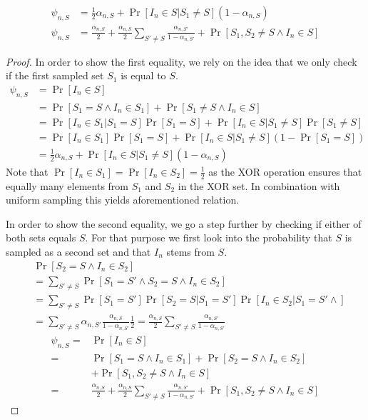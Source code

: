 \textbf{}
\begin{align}
  \psi_{n, S} &= \frac{1}{2} \alpha_{n, S} +  \Pr[I_n \in S | S_1 \neq S] (1 - \alpha_{n, S}) \\
  \psi_{n, S} &= \frac{\alpha_{n, S}}{2} +  \frac{\alpha_{n, S}}{2} \sum_{S'\neq S} \frac{\alpha_{n, S'}}{1 - \alpha_{n, S'}} + \Pr[S_1, S_2 \neq S \wedge I_n \in S]
\end{align}
\begin{proof}
  In order to show the first equality, we rely on the idea that we only check
  if the first sampled set $S_1$ is equal to $S$.
  \begin{align}
    \psi_{n, S} &= \Pr[I_n \in S] \\
      &= \Pr[S_1 = S \wedge I_n \in S_1] + \Pr[S_1 \neq S \wedge I_n \in S] \\
      &= \Pr[I_n \in S_1 | S_1 = S] \Pr[S_1 = S] + \Pr[I_n \in S| S_1 \neq
          S]\Pr[S_1 \neq S] \\
      &= \Pr[I_n \in S_1] \Pr[S_1 = S] + \Pr[I_n \in S| S_1 \neq S](1 - \Pr[S_1
          = S]) \\
      &= \frac{1}{2} \alpha_{n, S} +  \Pr[I_n \in S | S_1 \neq S] (1 -
          \alpha_{n, S})
  \end{align}
  Note that $\Pr[I_n \in S_1] = \Pr[I_n \in S_2] = \frac{1}{2}$ as the XOR
  operation ensures that equally many elements from $S_1$ and $S_2$ in the XOR
  set. In combination with uniform sampling this yields aforementioned relation.

  In order to show the second equality, we go a step further by checking if
  either of both sets equals $S$. For that purpose we first look into the
  probability that $S$ is sampled as a second set and that $I_n$ stems from $S$.
  \begin{align}
    & \Pr[S_2 = S \wedge I_n \in S_2] \\
    &= \sum_{S'\neq S}\Pr[S_1 = S' \wedge S_2 = S \wedge I_n \in S_2] \\
    &= \sum_{S'\neq S} \Pr[S_1 = S'] \Pr[S_2 = S | S_1 = S'] \Pr[I_n \in S_2 |
        S_1 = S' \wedge] \\
    &= \sum_{S'\neq S} \alpha_{n, S'} \frac{\alpha_{n, S}}{1 - \alpha_{n, S'}}
        \frac{1}{2} = \frac{\alpha_{n, S}}{2} \sum_{S'\neq S} \frac{\alpha_{n,
        S'}}{1 - \alpha_{n, S'}}
  \end{align}
  \begin{align}
    \psi_{n, S} =& \Pr[I_n \in S] \\
      =& \Pr[S_1 = S \wedge I_n \in S_1] + \Pr[S_2 = S \wedge I_n \in S_2]
          \nonumber \\
      &+\Pr[S_1, S_2 \neq S \wedge I_n \in S] \\
      =& \frac{\alpha_{n, S}}{2} +  \frac{\alpha_{n, S}}{2} \sum_{S'\neq S}
          \frac{\alpha_{n, S'}}{1 - \alpha_{n, S'}} + \Pr[S_1, S_2 \neq S
          \wedge I_n \in S]
    \end{align}
\end{proof}

